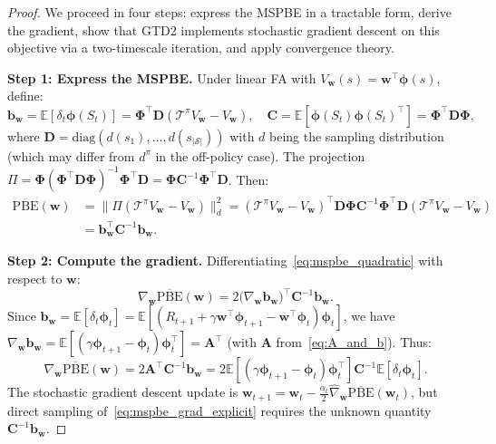\documentclass[11pt,a4paper]{article}
\theoremstyle{definition}
\theoremstyle{plain}
\theoremstyle{remark}
\newcommand{\E}{\mathbb{E}}
\begin{document}
\begin{proof}
We proceed in four steps: express the MSPBE in a tractable form, derive the gradient, show that GTD2 implements stochastic gradient descent on this objective via a two-timescale iteration, and apply convergence theory.

\textbf{Step 1: Express the MSPBE.} Under linear FA with $V_{\bm{w}}(s) = \bm{w}^\top\bm{\phi}(s)$, define:
\begin{equation}
    \bm{b}_{\bm{w}} = \E[\delta_t \bm{\phi}(S_t)] = \bm{\Phi}^\top\bm{D}(\mathcal{T}^\pi V_{\bm{w}} - V_{\bm{w}}), \quad \bm{C} = \E[\bm{\phi}(S_t)\bm{\phi}(S_t)^\top] = \bm{\Phi}^\top\bm{D}\bm{\Phi},
\end{equation}
where $\bm{D} = \text{diag}(d(s_1),\ldots,d(s_{|\mathcal{S}|}))$ with $d$ being the sampling distribution (which may differ from $d^\pi$ in the off-policy case). The projection $\Pi = \bm{\Phi}(\bm{\Phi}^\top\bm{D}\bm{\Phi})^{-1}\bm{\Phi}^\top\bm{D} = \bm{\Phi}\bm{C}^{-1}\bm{\Phi}^\top\bm{D}$. Then:
\begin{align}
    \overline{\text{PBE}}(\bm{w})
    &= \|\Pi(\mathcal{T}^\pi V_{\bm{w}} - V_{\bm{w}})\|_d^2
    = (\mathcal{T}^\pi V_{\bm{w}} - V_{\bm{w}})^\top\bm{D}\bm{\Phi}\bm{C}^{-1}\bm{\Phi}^\top\bm{D}(\mathcal{T}^\pi V_{\bm{w}} - V_{\bm{w}}) \nonumber\\
    &= \bm{b}_{\bm{w}}^\top\bm{C}^{-1}\bm{b}_{\bm{w}}.
    \label{eq:mspbe_quadratic}
\end{align}

\textbf{Step 2: Compute the gradient.} Differentiating~\eqref{eq:mspbe_quadratic} with respect to $\bm{w}$:
\begin{equation}
    \nabla_{\bm{w}}\overline{\text{PBE}}(\bm{w}) = 2\bigl(\nabla_{\bm{w}}\bm{b}_{\bm{w}}\bigr)^\top\bm{C}^{-1}\bm{b}_{\bm{w}}.
    \label{eq:mspbe_grad}
\end{equation}
Since $\bm{b}_{\bm{w}} = \E[\delta_t\bm{\phi}_t] = \E[(R_{t+1}+\gamma\bm{w}^\top\bm{\phi}_{t+1}-\bm{w}^\top\bm{\phi}_t)\bm{\phi}_t]$, we have $\nabla_{\bm{w}}\bm{b}_{\bm{w}} = \E[(\gamma\bm{\phi}_{t+1}-\bm{\phi}_t)\bm{\phi}_t^\top] = \bm{A}^\top$ (with $\bm{A}$ from~\eqref{eq:A_and_b}). Thus:
\begin{equation}
    \nabla_{\bm{w}}\overline{\text{PBE}}(\bm{w}) = 2\bm{A}^\top\bm{C}^{-1}\bm{b}_{\bm{w}} = 2\E[(\gamma\bm{\phi}_{t+1}-\bm{\phi}_t)\bm{\phi}_t^\top]\bm{C}^{-1}\E[\delta_t\bm{\phi}_t].
    \label{eq:mspbe_grad_explicit}
\end{equation}
The stochastic gradient descent update is $\bm{w}_{t+1} = \bm{w}_t - \frac{\alpha_t}{2}\hat{\nabla}_{\bm{w}}\overline{\text{PBE}}(\bm{w}_t)$, but direct sampling of~\eqref{eq:mspbe_grad_explicit} requires the unknown quantity $\bm{C}^{-1}\bm{b}_{\bm{w}}$.


\end{proof}
\end{document}
